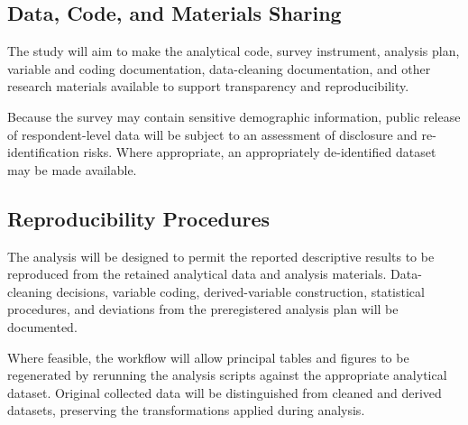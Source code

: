 \subsection{Data, Code, and Materials Sharing}


The study will aim to make the analytical code, survey instrument, analysis plan, variable and coding documentation, data-cleaning documentation, and other research materials available to support transparency and reproducibility.

Because the survey may contain sensitive demographic information, public release of respondent-level data will be subject to an assessment of disclosure and re-identification risks. Where appropriate, an appropriately de-identified dataset may be made available.

\subsection{Reproducibility Procedures}

The analysis will be designed to permit the reported descriptive results to be reproduced from the retained analytical data and analysis materials. Data-cleaning decisions, variable coding, derived-variable construction, statistical procedures, and deviations from the preregistered analysis plan will be documented.

Where feasible, the workflow will allow principal tables and figures to be regenerated by rerunning the analysis scripts against the appropriate analytical dataset. Original collected data will be distinguished from cleaned and derived datasets, preserving the transformations applied during analysis.

